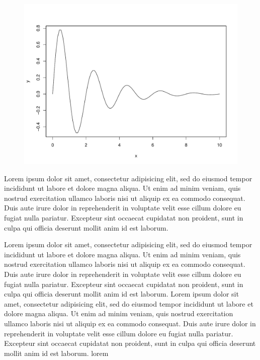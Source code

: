 \documentclass[12pt,titlepage,figuresatend]{article}
\begin{document}
\begin{figure}[p!]
  \centering\includegraphics[width=\hsize]{figure1}
  \caption[Caption for first figure.]{\label{figure1}}
\end{figure}
 

Lorem ipsum dolor sit amet, consectetur adipisicing elit, sed do eiusmod tempor
incididunt ut labore et dolore magna aliqua. Ut enim ad minim veniam, quis nostrud
exercitation ullamco laboris nisi ut aliquip ex ea commodo consequat. Duis aute irure
dolor in reprehenderit in voluptate velit esse cillum dolore eu fugiat nulla pariatur.
Excepteur sint occaecat cupidatat non proident, sunt in culpa qui officia deserunt
mollit anim id est laborum.


Lorem ipsum dolor sit amet, consectetur adipisicing elit, sed do eiusmod tempor
incididunt ut labore et dolore magna aliqua. Ut enim ad minim veniam, quis nostrud
exercitation ullamco laboris nisi ut aliquip ex ea commodo consequat. Duis aute irure
dolor in reprehenderit in voluptate velit esse cillum dolore eu fugiat nulla pariatur.
Excepteur sint occaecat cupidatat non proident, sunt in culpa qui officia deserunt
mollit anim id est laborum. Lorem ipsum dolor sit amet, consectetur adipisicing elit,
sed do eiusmod tempor incididunt ut labore et dolore magna aliqua. Ut enim ad minim
veniam, quis nostrud exercitation ullamco laboris nisi ut aliquip ex ea commodo
consequat. Duis aute irure dolor in reprehenderit in voluptate velit esse cillum
dolore eu fugiat nulla pariatur. Excepteur sint occaecat cupidatat non proident, sunt
in culpa qui officia deserunt mollit anim id est laborum. lorem
\end{document}
